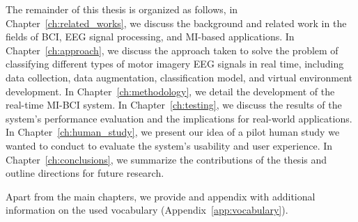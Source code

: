 The remainder of this thesis is organized as follows, in Chapter~\ref{ch:related_works}, we discuss the background and related work in the fields of BCI, EEG signal processing, and MI-based applications.
In Chapter~\ref{ch:approach}, we discuss the approach taken to solve the problem of classifying different types of motor imagery EEG signals in real time, including data collection, data augmentation, classification model, and virtual environment development.
In Chapter~\ref{ch:methodology}, we detail the development of the real-time MI-BCI system. %
In Chapter~\ref{ch:testing}, we discuss the results of the system's performance evaluation and the implications for real-world applications.
In Chapter~\ref{ch:human_study}, we present our idea of a pilot human study we wanted to conduct to evaluate the system's usability and user experience.
In Chapter~\ref{ch:conclusions}, we summarize the contributions of the thesis and outline directions for future research.

Apart from the main chapters, we provide and appendix with additional information on the used vocabulary (Appendix~\ref{app:vocabulary}).
